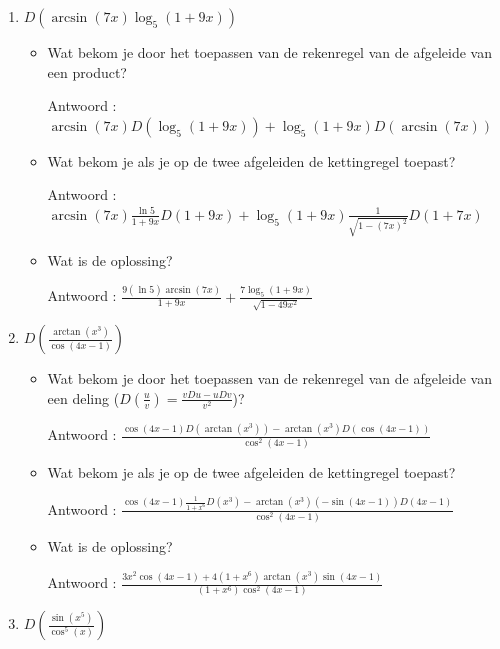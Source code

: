 \begin{enumerate}
	\item $D \left( \arcsin (7x)\log_5 (1+9x)   \right)$
	
	\begin{itemize}
		
		\item Wat bekom je door het toepassen van de rekenregel van de afgeleide van een product?
		
		Antwoord : $\arcsin (7x)D \left( \log_5(1+9x)  \right)+\log_5(1+9x)D \left(  \arcsin(7x)  \right)$
		
		\item Wat bekom je als je op de twee afgeleiden de kettingregel toepast?
		
		Antwoord :  $\arcsin (7x)\frac{\ln 5}{1+9x}D(1+9x)+\log_5(1+9x)\frac{1}{\sqrt{1-(7x)^2}}D(1+7x)$
		
		\item Wat is de oplossing?
		
		Antwoord : $\frac{9 \left( \ln 5  \right)\arcsin (7x)}{1+9x}+\frac{7\log_5(1+9x)}{\sqrt{1-49x^2}}$
		
	\end{itemize}
	
	\item $D \left( \frac{\arctan \left( x^3  \right)}{\cos (4x-1)}  \right)$
	
	\begin{itemize}
		
		\item Wat bekom je door het toepassen van de rekenregel van de afgeleide van een deling ($D \left(  \frac{u}{v} \right)=\frac {vDu-uDv}{v^2}$)?
		
		Antwoord : $\frac {\cos (4x-1) D \left(  \arctan \left( x^3 \right)  \right)-\arctan \left( x^3 \right)D\left( \cos (4x-1)  \right)}{\cos ^2(4x-1)}$
		
		\item Wat bekom je als je op de twee afgeleiden de kettingregel toepast?
		
		Antwoord : $\frac {\cos (4x-1) \frac{1}{1+x^6}D\left( x^3 \right)-\arctan \left( x^3 \right)\left(- \sin (4x-1)  \right)D(4x-1)}{\cos ^2(4x-1)}$
		
		\item Wat is de oplossing?
		
		Antwoord : $\frac {3x^2\cos (4x-1) +4(1+x^6)\arctan \left( x^3 \right) \sin (4x-1)}{(1+x^6)\cos ^2(4x-1)}$
		
	\end{itemize}
	
	\item $D \left(  \frac{\sin \left( x^5  \right)}{\cos ^5 (x)}  \right)$
	

\end{enumerate}
